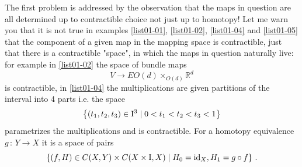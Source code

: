     The first problem is addressed by the observation that the maps in question are all determined up to contractible choice not just up to homotopy! Let me warn you that it is not true in examples \ref{list01-01}, \ref{list01-02}, \ref{list01-04} and \ref{list01-05} that the component of a given map in the mapping space is contractible, just that there is a contractible "space", in which the maps in question naturally live: for example in \ref{list01-02} the space of bundle maps
    \begin{equation*}
        V \to EO(d) \times_{O(d)} \mathbb{R}^d
    \end{equation*}
    is contractible, in \ref{list01-04} the multiplications are given partitions of the interval into 4 parts i.e. the space
    \begin{equation*}
        \left \{ (t_1, t_2, t_3) \in \mathrm{I}^3 \mid 0 < t_1 < t_2 < t_3 < 1 \right \}
    \end{equation*}
    parametrizes the multiplications and is contractible. For a homotopy equivalence $g \, \colon \, Y \to X$ it is a space of pairs
    \begin{equation*}
        \left \{ (f, H) \in C(X, Y) \times C(X \times \mathrm{I}, X) \mid H_0 = \operatorname{id}_X, H_1 = g \circ f \right \} \,.
    \end{equation*}

